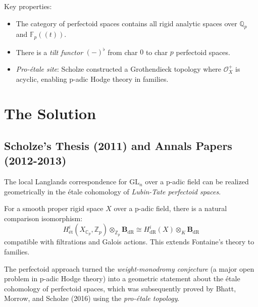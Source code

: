 Key properties:
\begin{itemize}
\item The category of perfectoid spaces contains all rigid analytic spaces over $\mathbb{Q}_p$ and $\mathbb{F}_p((t))$.
\item There is a \emph{tilt functor} $(-)^{\flat}$ from char $0$ to char $p$ perfectoid spaces.
\item \emph{Pro-\'etale site}: Scholze constructed a Grothendieck topology where $\mathcal{O}_X^+$ is acyclic, enabling p-adic Hodge theory in families.
\end{itemize}

\section{The Solution}

\subsection{Scholze's Thesis (2011) and Annals Papers (2012-2013)}

\begin{theorem}
The local Langlands correspondence for $\text{GL}_n$ over a p-adic field can be realized geometrically in the \'etale cohomology of \emph{Lubin-Tate perfectoid spaces}.
\end{theorem}

\begin{theorem}
For a smooth proper rigid space $X$ over a p-adic field, there is a natural comparison isomorphism:
\[
H^i_{\text{\'et}}(X_{\mathbb{C}_p}, \mathbb{Z}_p) \otimes_{\mathbb{Z}_p} \mathbf{B}_{\text{dR}} \cong H^i_{\text{dR}}(X) \otimes_K \mathbf{B}_{\text{dR}}
\]
compatible with filtrations and Galois actions. This extends Fontaine's theory to families.
\end{theorem}

\begin{highlightbox}
The perfectoid approach turned the \emph{weight-monodromy conjecture} (a major open problem in p-adic Hodge theory) into a geometric statement about the \'etale cohomology of perfectoid spaces, which was subsequently proved by Bhatt, Morrow, and Scholze (2016) using the \emph{pro-\'etale topology}.
\end{highlightbox}

